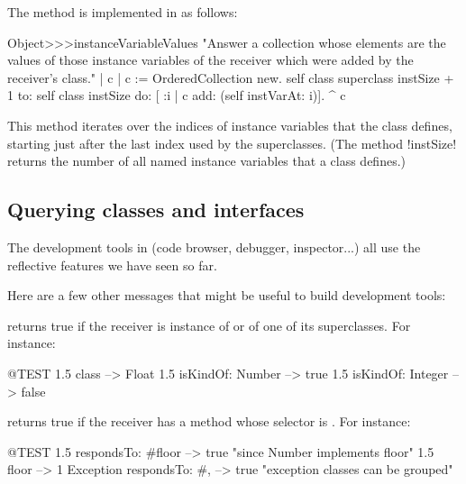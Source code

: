\documentclass[a4paper,10pt,twoside]{book}
\begin{document}
The method is implemented in  as follows:
\begin{code}{}
Object>>>instanceVariableValues
	"Answer a collection whose elements are the values of those instance variables of the receiver which were added by the receiver's class."	
	| c |
	c := OrderedCollection new.
	self class superclass instSize + 1
		to: self class instSize
		do: [ :i | c add: (self instVarAt: i)].
	^ c
\end{code}

This method iterates over the indices of instance variables that the class defines, starting just after the last index used by the superclasses.
(The method \ct!instSize! returns the number of all named instance variables that a class defines.)

\subsection{Querying classes and interfaces}

The development tools in \pharo (code browser, debugger, inspector...) all use the reflective features we have seen so far.

Here are a few other messages that might be useful to build development tools:

 returns true if the receiver is instance of  or of one of its superclasses.
For instance:
\begin{code}{@TEST}
1.5 class                     --> Float
1.5 isKindOf: Number --> true
1.5 isKindOf: Integer   --> false
\end{code}

 returns true if the receiver has a method whose selector is .
For instance:
\begin{code}{@TEST}
1.5 respondsTo: #floor      --> true    "since Number implements floor"
1.5 floor                            --> 1
Exception respondsTo: #, --> true    "exception classes can be grouped"
\end{code}

\end{document}
